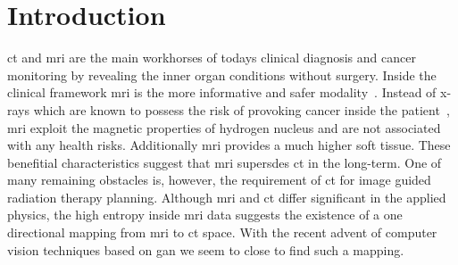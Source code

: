 \section{Introduction}

\gls{ct} and \gls{mri} are the main workhorses of todays clinical diagnosis
and cancer monitoring by revealing the inner organ conditions without surgery.
Inside the clinical framework \gls{mri} is the more informative and safer
modality~\cite{Hartwig09}. Instead of x-rays which are known to possess the
risk of provoking cancer inside the patient~\cite{Martin06}, \gls{mri} exploit
the magnetic properties of hydrogen nucleus and are not associated with any
health risks. Additionally \gls{mri} provides a much higher soft tissue. These
benefitial characteristics suggest that \gls{mri} supersdes \gls{ct} in the
long-term. One of many remaining obstacles is, however, the requirement of
\gls{ct} for image guided radiation therapy planning. Although \gls{mri} and
\gls{ct} differ significant in the applied physics, the high entropy inside
\gls{mri} data suggests the existence of a one directional mapping from
\gls{mri} to \gls{ct} space. With the recent advent of computer vision
techniques based on \gls{gan} we seem to close to find such a mapping.
